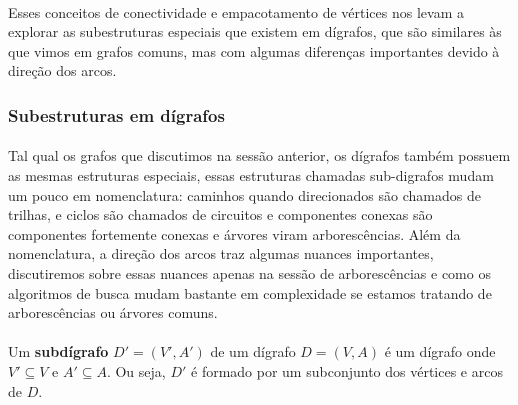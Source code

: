 \documentclass[12pt,a4paper]{article}
\begin{document}
\paragraph{}
Esses conceitos de conectividade e empacotamento de vértices nos levam a explorar as subestruturas especiais que existem em dígrafos, que são similares às que vimos em grafos comuns, mas com algumas diferenças importantes devido à direção dos arcos.

\subsubsection{Subestruturas em dígrafos}

\paragraph{}
Tal qual os grafos que discutimos na sessão anterior, os dígrafos também possuem as mesmas estruturas especiais, essas estruturas chamadas sub-digrafos mudam um pouco em nomenclatura: caminhos quando direcionados são chamados de trilhas, e ciclos são chamados de circuitos e componentes conexas são componentes fortemente conexas e árvores viram arborescências. Além da nomenclatura, a direção dos arcos traz algumas nuances importantes, discutiremos sobre essas nuances apenas na sessão de arborescências e como os algoritmos de busca mudam bastante em complexidade se estamos tratando de arborescências ou árvores comuns.

\paragraph{}
Um \textbf{subdígrafo} \(D' = (V', A')\) de um dígrafo \(D = (V, A)\) é um dígrafo onde \(V' \subseteq V\) e \(A' \subseteq A\). Ou seja, \(D'\) é formado por um subconjunto dos vértices e arcos de \(D\).
\end{document}
